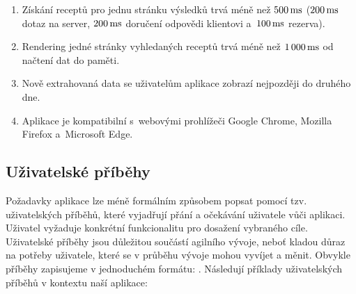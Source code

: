 \begin{enumerate}
    \item Získání receptů pro jednu stránku výsledků trvá méně než $500\,\rm ms$ ($200\,\rm ms$ dotaz na server, $200\,\rm ms$ doručení odpovědi klientovi a~$100\,\rm ms$ rezerva).
    \item Rendering jedné stránky vyhledaných receptů trvá méně než $1\,000\,\rm ms$ od načtení dat do paměti.
    \item Nově extrahovaná data se uživatelům aplikace zobrazí nejpozději do druhého dne. 
    \item Aplikace je kompatibilní s~webovými prohlížeči Google Chrome, Mozilla Firefox a~Microsoft Edge.
\end{enumerate}

\subsection{Uživatelské příběhy}

Požadavky aplikace lze méně formálním způsobem popsat pomocí tzv. uživatelských příběhů, které vyjadřují přání a očekávání uživatele vůči aplikaci. Uživatel vyžaduje konkrétní funkcionalitu pro dosažení vybraného cíle. Uživatelské příběhy jsou důležitou součástí agilního vývoje, neboť kladou důraz na potřeby uživatele, které se v průběhu vývoje mohou vyvíjet a měnit. Obvykle příběhy zapisujeme v jednoduchém formátu:  \citep{user-stories}. Následují příklady uživatelských příběhů v kontextu naší aplikace:

